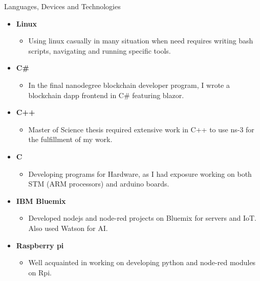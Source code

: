 \documentclass[]{mcdowellcv}
\begin{document}
\begin{cvsection}{Languages, Devices and Technologies}
\begin{cvsubsection}{}{}{}
\begin{itemize}
                                  \item \textbf{Linux}
				\begin{itemize}
					\item Using linux casually in many situation when need requires writing bash scripts, navigating and running specific tools. 
				\end{itemize}
				\item \textbf{C\#}
				\begin{itemize}
					\item In the final nanodegree blockchain developer program, I wrote a blockchain dapp frontend in C\# featuring blazor.
				\end{itemize}
				\item \textbf{C++}
				\begin{itemize}
					\item Master of Science thesis required extensive work in C++ to use ns-3 for the fulfillment of my work.
				\end{itemize}
				\item \textbf{C}
				\begin{itemize}
					\item Developing programs for Hardware, as I had exposure working on both STM (ARM processors) and arduino boards.
                                     \end{itemize}
				\item \textbf{IBM Bluemix}
				\begin{itemize}
					\item Developed nodejs and node-red projects on Bluemix for servers and IoT. Also used Watson for AI.
                                     \end{itemize}
                                     \item \textbf{Raspberry pi}
				\begin{itemize}
					\item Well acquainted in working on developing python and node-red modules on Rpi.
				\end{itemize}
				

\end{itemize}
\end{cvsubsection}
\end{cvsection}
\end{document}
